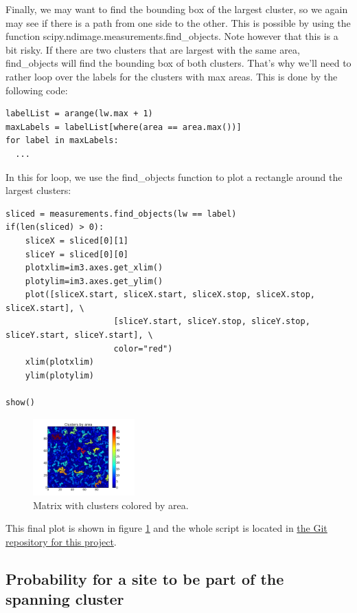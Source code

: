 \documentclass[a4paper,reprint,floatfix,amsmath,amssymb,aps,pra]{revtex4-1}
\begin{document}
Finally, we may want to find the bounding box of the largest cluster, so we again may see if there is a path from one side to the other. This is possible by using the function scipy.ndimage.measurements.find\_objects. Note however that this is a bit risky. If there are two clusters that are largest with the same area, find\_objects will find the bounding box of both clusters. That's why we'll need to rather loop over the labels for the clusters with max areas. This is done by the following code:
%
\begin{lstlisting}
labelList = arange(lw.max + 1)
maxLabels = labelList[where(area == area.max())]
for label in maxLabels:
  ...
\end{lstlisting}
%
In this for loop, we use the find\_objects function to plot a rectangle around the largest clusters:
%
\begin{lstlisting}
sliced = measurements.find_objects(lw == label)
if(len(sliced) > 0):
    sliceX = sliced[0][1]
    sliceY = sliced[0][0]
    plotxlim=im3.axes.get_xlim()
    plotylim=im3.axes.get_ylim()
    plot([sliceX.start, sliceX.start, sliceX.stop, sliceX.stop, sliceX.start], \
                      [sliceY.start, sliceY.stop, sliceY.stop, sliceY.start, sliceY.start], \
                      color="red")
    xlim(plotxlim)
    ylim(plotylim)

show()
\end{lstlisting}
%
\begin{figure}
  \centering
  \includegraphics[width=0.35\textwidth]{./images/bounding-box.png}
  \caption{Matrix with clusters colored by area.}
  \label{fig:intro-final}
\end{figure}
%
This final plot is shown in figure \ref{fig:intro-final} and the whole script is located in \href{https://github.com/dragly/fys4460-project3}{the Git repository for this project}.

\subsection{Probability for a site to be part of the spanning cluster}
\end{document}
